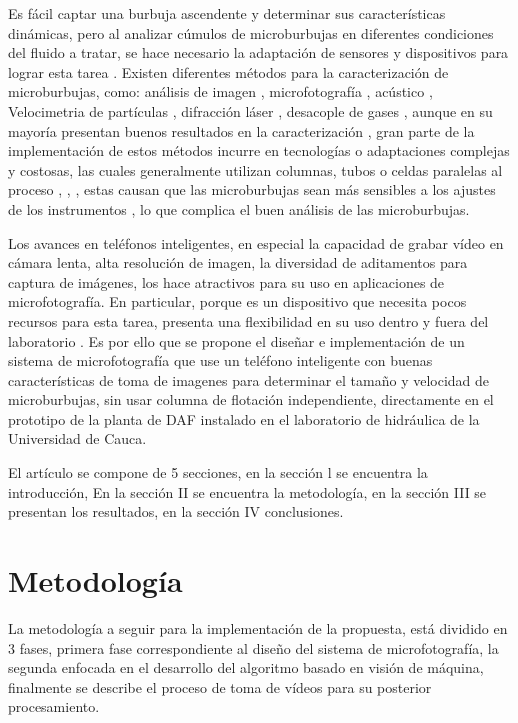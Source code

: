 \documentclass[12pt,twocolumn,a4paper]{article}
\begin{document}
Es fácil captar una burbuja ascendente y determinar sus características dinámicas, pero al  analizar cúmulos de microburbujas en diferentes condiciones del fluido a tratar, se hace necesario la adaptación de sensores y dispositivos para lograr esta tarea \cite{brasileiro2020construction}. Existen diferentes métodos para la caracterización de microburbujas, como: análisis de imagen \cite{swart2020situ}, microfotografía \cite{sadeghi2020experimental}, acústico \cite{guan2017bubble}, Velocimetria de partículas \cite{levitsky2021microbubbles}, difracción láser \cite{reis2016study}, desacople de gases \cite{parmar2015terminal}, aunque en su mayoría presentan buenos resultados en la caracterización \cite{gulden2018online} \cite{eskanlou2018interactional} \cite{aumelas2016micro}, gran parte de la implementación de estos métodos incurre en tecnologías o adaptaciones complejas y costosas, las cuales generalmente utilizan columnas, tubos o celdas paralelas al proceso \cite{reis2016study}  \cite{swart2020situ}  \cite{han2002development}, \cite{cheng2016bubble}, \cite{jeon2018bubble}, estas causan que las microburbujas sean más sensibles a los ajustes de los instrumentos \cite{jeon2018bubble}, lo que complica el buen análisis de las microburbujas.

Los avances en teléfonos inteligentes, en especial la capacidad de grabar vídeo en cámara lenta, alta resolución de imagen, la diversidad de aditamentos para captura de imágenes, los hace atractivos para su uso en aplicaciones de microfotografía. En particular, porque es un dispositivo que necesita pocos recursos para esta tarea, presenta una flexibilidad en su uso dentro y fuera del laboratorio \cite{orth2018dual}. Es por ello que se propone el diseñar e implementación de un sistema de microfotografía que use un teléfono inteligente con buenas características de toma de imagenes para determinar el tamaño y velocidad de microburbujas, sin usar columna de flotación independiente, directamente   en el prototipo de la planta de DAF instalado en el laboratorio de hidráulica de la Universidad de Cauca.

El artículo se compone de 5 secciones, en la sección l se encuentra la introducción, En la sección II se encuentra la metodología, en la sección III  se presentan los resultados,  en la sección IV  conclusiones.

\section{Metodología}
La metodología a seguir para la implementación de la propuesta, está dividido en 3 fases, primera fase correspondiente al diseño del sistema de microfotografía,  la segunda enfocada en el desarrollo del algoritmo basado en visión de máquina, finalmente se describe el proceso de toma de vídeos para su posterior procesamiento.
\end{document}
